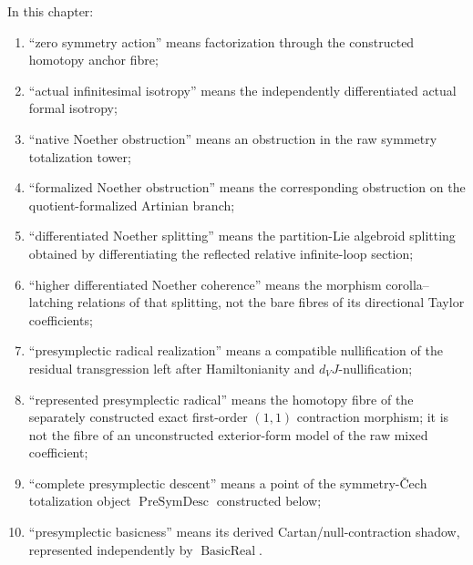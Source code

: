 \begin{convention}
\label{conv:symmetry-noether-non-conflation}
In this chapter:
\begin{enumerate}
\item ``zero symmetry action'' means factorization through the constructed homotopy
      anchor fibre;
\item ``actual infinitesimal isotropy'' means the independently differentiated
      actual formal isotropy;
\item ``native Noether obstruction'' means an obstruction in the raw symmetry
      totalization tower;
\item ``formalized Noether obstruction'' means the corresponding obstruction on the
      quotient-formalized Artinian branch;
\item ``differentiated Noether splitting'' means the partition-Lie algebroid
      splitting obtained by differentiating the reflected relative infinite-loop
      section;
\item ``higher differentiated Noether coherence'' means the morphism
      corolla--latching relations of that splitting, not the bare fibres of its
      directional Taylor coefficients;
\item ``presymplectic radical realization'' means a compatible nullification of the
      residual transgression left after Hamiltonianity and $d_VJ$-nullification;
\item ``represented presymplectic radical'' means the homotopy fibre of the separately
      constructed exact first-order $(1,1)$ contraction morphism; it is not the fibre
      of an unconstructed exterior-form model of the raw mixed coefficient;
\item ``complete presymplectic descent'' means a point of the symmetry-\v{C}ech
      totalization object $\operatorname{PreSymDesc}$ constructed below;
\item ``presymplectic basicness'' means its derived Cartan/null-contraction shadow,
      represented independently by $\operatorname{BasicReal}$.
\end{enumerate}
\end{convention}


